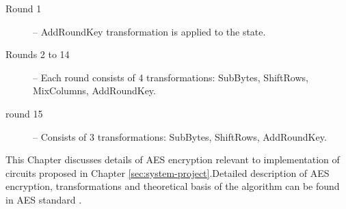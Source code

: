 \begin{description}
\item[Round 1] -- AddRoundKey transformation is applied to the state.
\item[Rounds 2 to 14] -- Each round consists of 4 transformations: SubBytes, ShiftRows, MixColumns, AddRoundKey.
\item[round 15] -- Consists of 3 transformations: SubBytes, ShiftRows, AddRoundKey.
\end{description}

This Chapter discusses details of AES encryption relevant to implementation of circuits proposed in Chapter \ref{sec:system-project}.Detailed description of AES encryption, transformations and theoretical basis of the algorithm can be found in AES standard \cite{aes-standard}.






